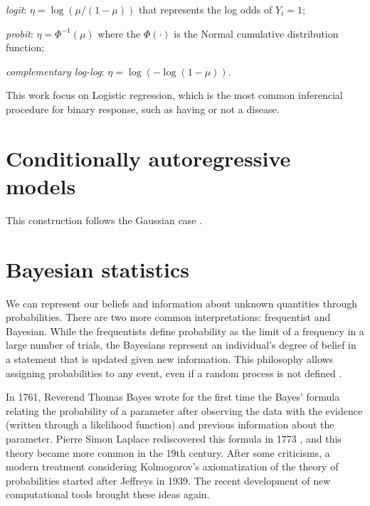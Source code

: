 \begin{alineas}
  \item \textit{logit}: $\eta = \log(\mu / (1 - \mu))$ that represents 
  the log odds of $Y_i = 1$;
  \item \textit{probit}: $\eta = \Phi^{-1}(\mu)$ where the $\Phi(\cdot)$ 
  is the Normal cumulative distribution function; 
  \item \textit{complementary log-log}: $\eta = \log(-\log(1 - \mu))$.
\end{alineas}

This work focus on Logistic regression, which is the most common inferencial
procedure for binary response, such as having or not a disease. 

\section{Conditionally autoregressive models}
\label{sec:car-models}

This construction follows the Gaussian case \cite[Section
3.3.1]{banerjee2003hierarchical}. 


\section{Bayesian statistics}
\label{sec:bayesian_statistics}

We can represent our beliefs and information about unknown quantities 
through probabilities. There are two more common interpretations: 
frequentist and Bayesian. While the frequentists define
probability as the limit of a frequency in a large number of trials, the
Bayesians represent an individual's degree of belief in a statement that is
updated given new information. This philosophy allows assigning probabilities
to any event, even if a random process is not defined \cite{statisticat2016laplacesdemon}. 

In 1761, Reverend Thomas Bayes wrote for the first time the Bayes' formula
relating the probability of a parameter after observing the data with the
evidence (written through a likelihood function) and previous information
about the parameter. Pierre Simon Laplace rediscovered this formula in 1773
\cite{Robert2007}, and this theory became more common in the 19th century.
After some criticisms, a modern treatment considering Kolmogorov's
axiomatization of the theory of probabilities started after Jeffreys in 1939.
The recent development of new computational tools brought these ideas again.

